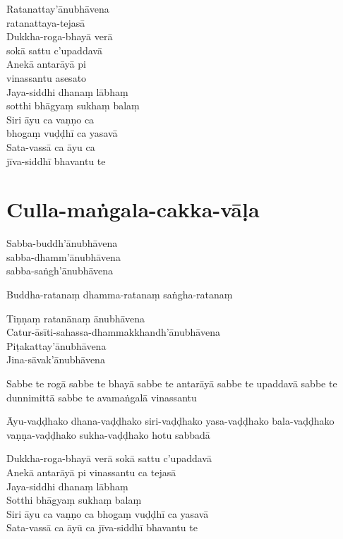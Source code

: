 
\begin{paritta}
  Ratanattay'ānubhāvena\\\vin ratanattaya-tejasā\\
  Dukkha-roga-bhayā verā\\\vin sokā sattu c'upaddavā\\
  Anekā antarāyā pi\\\vin vinassantu asesato\\
  Jaya-siddhi dhanaṃ lābhaṃ\\\vin sotthi bhāgyaṃ sukhaṃ balaṃ\\
  Siri āyu ca vaṇṇo ca\\\vin bhogaṃ vuḍḍhī ca yasavā\\
  Sata-vassā ca āyu ca\\\vin jīva-siddhī bhavantu te
\end{paritta}

\section{Culla-maṅgala-cakka-vāḷa}

\enlargethispage{\baselineskip}


Sabba-buddh'ānubhāvena\\
sabba-dhamm'ānubhāvena\\
sabba-saṅgh'ānubhāvena

Buddha-ratanaṃ dhamma-ratanaṃ saṅgha-ratanaṃ

Tiṇṇaṃ ratanānaṃ ānubhāvena\\
Catur-āsīti-sahassa-dhammakkhandh'ānubhāvena\\
Piṭakattay'ānubhāvena\\
Jina-sāvak'ānubhāvena

Sabbe te rogā sabbe te bhayā sabbe te antarāyā sabbe te upaddavā sabbe te
dunnimittā sabbe te avamaṅgalā vinassantu

Āyu-vaḍḍhako dhana-vaḍḍhako siri-vaḍḍhako yasa-vaḍḍhako bala-vaḍḍhako
vaṇṇa-vaḍḍhako sukha-vaḍḍhako hotu sabbadā

Dukkha-roga-bhayā verā sokā sattu c'upaddavā\\
Anekā antarāyā pi vinassantu ca tejasā\\
Jaya-siddhi dhanaṃ lābhaṃ\\
Sotthi bhāgyaṃ sukhaṃ balaṃ\\
Siri āyu ca vaṇṇo ca bhogaṃ vuḍḍhī ca yasavā\\
Sata-vassā ca āyū ca jīva-siddhī bhavantu te

